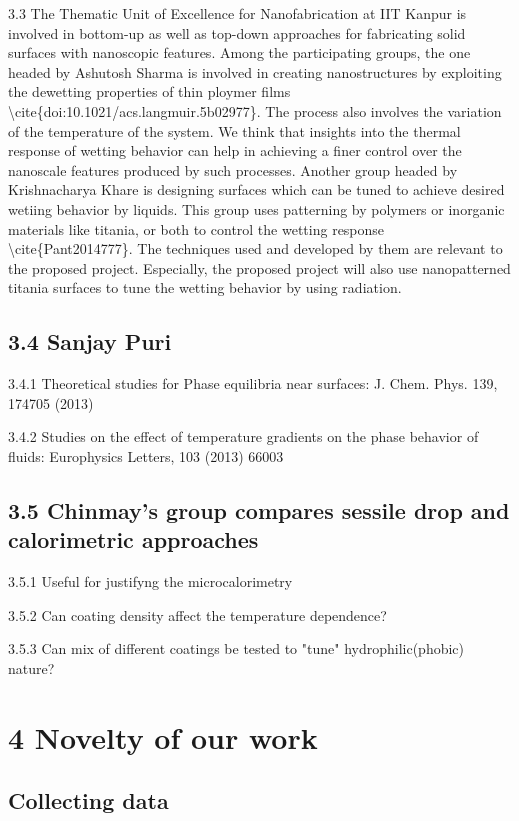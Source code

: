 \par 3.3 The Thematic Unit of Excellence for Nanofabrication at IIT Kanpur is involved in bottom-up as well as top-down approaches for fabricating solid surfaces with nanoscopic features. Among the participating groups, the one headed by Ashutosh Sharma is involved in creating nanostructures by exploiting the dewetting properties of thin ploymer films \textbackslash cite\{doi:10.1021/acs.langmuir.5b02977\}. The process also involves the variation of the temperature of the system. We think that insights into the thermal response of wetting behavior can help in achieving a finer control over the nanoscale features produced by such processes. Another group headed by Krishnacharya Khare is designing surfaces which can be tuned to achieve desired wetiing behavior by liquids. This group uses patterning by polymers or inorganic materials like titania, or both to control the wetting response \textbackslash cite\{Pant2014777\}. The techniques used and developed by them are relevant to the proposed project. Especially, the proposed project will also use nanopatterned titania surfaces to tune the wetting behavior by using radiation.\subsection{3.4 Sanjay Puri}

\par 3.4.1 Theoretical studies for Phase equilibria near surfaces: J. Chem. Phys. 139, 174705 (2013)
\par 3.4.2 Studies on the effect of temperature gradients on the phase behavior of fluids: Europhysics Letters, 103 (2013) 66003\subsection{3.5 Chinmay's group compares sessile drop and calorimetric approaches}

\par 3.5.1 Useful for justifyng the microcalorimetry
\par 3.5.2 Can coating density affect the temperature dependence?
\par 3.5.3 Can mix of different coatings be tested to "tune" hydrophilic(phobic) nature?\section{4 Novelty of our work}
\subsection{Collecting data}

